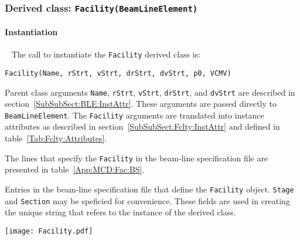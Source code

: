 \FloatBarrier

\subsubsection{Derived class: \texttt{Facility(BeamLineElement)}}

\paragraph{Instantiation} ~\newline
\noindent
The call to instantiate the \texttt{Facility} derived class is:
\begin{center}
  \texttt{Facility(Name, rStrt, vStrt, drStrt, dvStrt, p0, VCMV)}
\end{center}
Parent class arguments \texttt{Name}, \texttt{rStrt}, \texttt{vStrt},
\texttt{drStrt}, and \texttt{dvStrt} are described in
section~\ref{SubSubSect:BLE:InstAttr}.
These arguments are passed directly to \texttt{BeamLineElement}.
The \texttt{Facility} arguments are translated into instance
attributes as described in section~\ref{SubSubSect:Fclty:InstAttr} and
defined in table~\ref{Tab:Fclty:Attributes}.

The lines that specify the \texttt{Facility} in the beam-line
specification file are presented in table~\ref{App:MCD:Fac:BS}.
\begin{table}[h]
  \caption{
    Entries in the beam-line specification file that define the
    \texttt{Facility} object.
    \texttt{Stage} and \texttt{Section} may be speficied for
    convenience.
    These fields are used in creating the unique string that refers
    to the instance of the derived class.
  }
  \label{App:MCD:Fac:BS}
  \begin{center}
    \texttt{[image: Facility.pdf]}
  \end{center}
\end{table}

